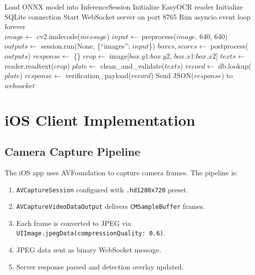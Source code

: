 \documentclass[11pt]{report}
\begin{document}
\begin{algorithm}[H]
\caption{WebSocket Server Main Loop}
\begin{algorithmic}[1]
    \State Load ONNX model into InferenceSession
    \State Initialize EasyOCR reader
    \State Initialize SQLite connection
    \State Start WebSocket server on port 8765
    \State Run asyncio event loop forever
\EndFunction
\\
        \State $image \gets$ cv2.imdecode($message$)
        \State $input \gets$ preprocess($image$, 640, 640)
        \State $outputs \gets$ session.run(None, \{``images'': $input$\})
        \State $boxes, scores \gets$ postprocess($outputs$)
        \State $response \gets$ \{\}
            \State $crop \gets$ image[$box.y1$:$box.y2$, $box.x1$:$box.x2$]
            \State $texts \gets$ reader.readtext($crop$)
            \State $plate \gets$ clean\_and\_validate($texts$)
                \State $record \gets$ db.lookup($plate$)
                    \State $response \gets$ verification\_payload($record$)
                \EndIf
            \EndIf
        \EndFor
        \State Send JSON($response$) to $websocket$
    \EndFor
\EndFunction
\end{algorithmic}
\end{algorithm}

\section{iOS Client Implementation}
\subsection{Camera Capture Pipeline}
The iOS app uses AVFoundation to capture camera frames. The pipeline is:
\begin{enumerate}
    \item \texttt{AVCaptureSession} configured with \texttt{.hd1280x720} preset.
    \item \texttt{AVCaptureVideoDataOutput} delivers \texttt{CMSampleBuffer} frames.
    \item Each frame is converted to JPEG via \texttt{UIImage.jpegData(compressionQuality: 0.6)}.
    \item JPEG data sent as binary WebSocket message.
    \item Server response parsed and detection overlay updated.
\end{enumerate}
\end{document}
